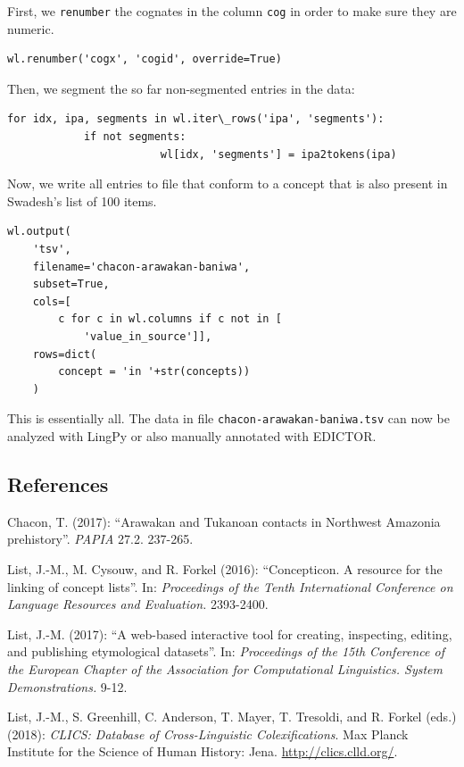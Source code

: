 \documentclass[
  english,
  a4paper,
  oneside,tablecaptionabove
]{scrbook}
\newcommand{\passthrough}[1]{#1}
\begin{document}
First, we \passthrough{\lstinline!renumber!} the cognates in the column
\passthrough{\lstinline!cog!} in order to make sure they are numeric.

\begin{lstlisting}
wl.renumber('cogx', 'cogid', override=True)
\end{lstlisting}

Then, we segment the so far non-segmented entries in the data:
\begin{lstlisting}
for idx, ipa, segments in wl.iter\_rows('ipa', 'segments'):
            if not segments:
                        wl[idx, 'segments'] = ipa2tokens(ipa)
\end{lstlisting}


Now, we write all entries to file that conform to a concept that is also
present in Swadesh's list of 100 items.

\begin{lstlisting}
wl.output(
    'tsv', 
    filename='chacon-arawakan-baniwa', 
    subset=True, 
    cols=[
        c for c in wl.columns if c not in [
            'value_in_source']],
    rows=dict(
        concept = 'in '+str(concepts))
    )
\end{lstlisting}

This is essentially all. The data in file
\passthrough{\lstinline!chacon-arawakan-baniwa.tsv!} can now be analyzed
with LingPy or also manually annotated with EDICTOR.

\hypertarget{references}{\subsection*{References}\label{references}}

Chacon, T. (2017): ``Arawakan and Tukanoan contacts in Northwest
Amazonia prehistory''. \emph{PAPIA} 27.2. 237-265.

List, J.-M., M. Cysouw, and R. Forkel (2016): ``Concepticon. A
resource for the linking of concept lists''. In: \emph{Proceedings of the Tenth
International Conference on Language Resources and Evaluation.}
2393-2400.

List, J.-M. (2017): ``A web-based interactive tool for creating,
inspecting, editing, and publishing etymological datasets''. In:
\emph{Proceedings of the 15th Conference of the European Chapter of the
Association for Computational Linguistics. System Demonstrations.}
9-12.

List, J.-M., S. Greenhill, C. Anderson, T. Mayer, T. Tresoldi, and
R. Forkel (eds.) (2018): \emph{CLICS: Database of Cross-Linguistic
Colexifications}. Max Planck Institute for the Science of Human History:
Jena. \href{//clics.clld.org/”}{http://clics.clld.org/}.
\end{document}
